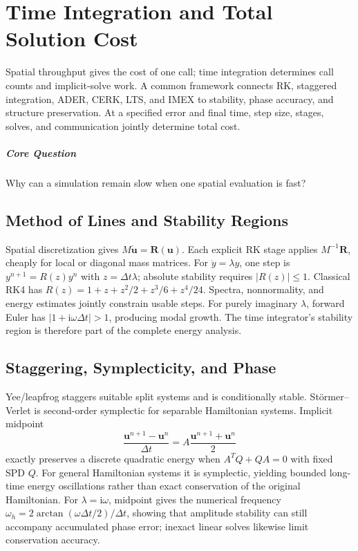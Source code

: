 \chapter{Time Integration and Total Solution Cost}\label{v0ch:25}
\begin{chaptersummary}
Spatial throughput gives the cost of one call; time integration determines call counts and implicit-solve work. A common framework connects RK, staggered integration, ADER, CERK, LTS, and IMEX to stability, phase accuracy, and structure preservation. At a specified error and final time, step size, stages, solves, and communication jointly determine total cost.
\end{chaptersummary}
\paragraph{Core Question}Why can a simulation remain slow when one spatial evaluation is fast?

\section{Method of Lines and Stability Regions}
Spatial discretization gives $M\dot{\bm u}=\bm R(\bm u)$. Each explicit RK stage applies $M^{-1}\bm R$, cheaply for local or diagonal mass matrices. For $\dot y=\lambda y$, one step is $y^{n+1}=R(z)y^n$ with $z=\Delta t\lambda$; absolute stability requires $|R(z)|\le1$. Classical RK4 has
$R(z)=1+z+z^2/2+z^3/6+z^4/24$. Spectra, nonnormality, and energy estimates jointly constrain usable steps.
For purely imaginary $\lambda$, forward Euler has $|1+\mathrm i\omega\Delta t|>1$, producing modal growth. The time integrator's stability region is therefore part of the complete energy analysis.
\section{Staggering, Symplecticity, and Phase}
Yee/leapfrog staggers suitable split systems and is conditionally stable. St\"ormer--Verlet is second-order symplectic for separable Hamiltonian systems. Implicit midpoint
\[
 \frac{\bm u^{n+1}-\bm u^n}{\Delta t}
 =A\frac{\bm u^{n+1}+\bm u^n}{2}
\]
exactly preserves a discrete quadratic energy when $A^TQ+QA=0$ with fixed SPD $Q$. For general Hamiltonian systems it is symplectic, yielding bounded long-time energy oscillations rather than exact conservation of the original Hamiltonian.
For $\lambda=\mathrm i\omega$, midpoint gives the numerical frequency
$\omega_h=2\arctan(\omega\Delta t/2)/\Delta t$, showing that amplitude stability can still accompany accumulated phase error; inexact linear solves likewise limit conservation accuracy.
